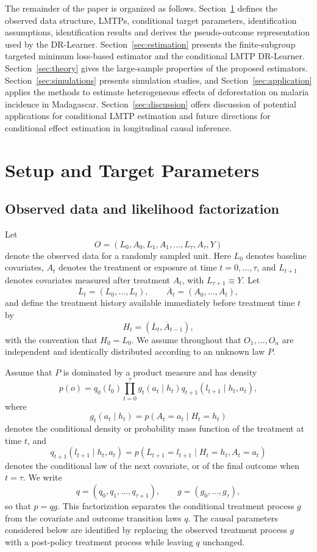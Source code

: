 \documentclass[11pt]{article}
\begin{document}
The remainder of the paper is organized as follows. Section~\ref{sec:setup}
defines the observed data structure, LMTPs, conditional target parameters,
identification assumptions, identification results and derives the
pseudo-outcome representation used by the DR-Learner.
Section~\ref{sec:estimation} presents the finite-subgroup targeted minimum
loss-based estimator and the conditional LMTP DR-Learner.
Section~\ref{sec:theory} gives the large-sample properties of the proposed
estimators. Section~\ref{sec:simulations} presents simulation studies, and
Section~\ref{sec:application} applies the methods to estimate heterogeneous
effects of deforestation on malaria incidence in Madagascar.
Section~\ref{sec:discussion} offers discussion of potential applications for
conditional LMTP estimation and future directions for conditional effect
estimation in longitudinal causal inference.

\section{Setup and Target Parameters}
\label{sec:setup}
\subsection{Observed data and likelihood factorization}
\label{subsec:observed-data}

Let
\[
  O = (L_0, A_0, L_1, A_1, \ldots, L_\tau, A_\tau, Y)
\]
denote the observed data for a randomly sampled unit. Here \(L_0\) denotes
baseline covariates, \(A_t\) denotes the treatment or exposure at time
\(t=0,\ldots,\tau\), and \(L_{t+1}\) denotes covariates measured after treatment
\(A_t\), with \(L_{\tau+1} \equiv Y\). Let
\[
  \overline L_t = (L_0,\ldots,L_t),
  \qquad
  \overline A_t = (A_0,\ldots,A_t),
\]
and define the treatment history available immediately before treatment time
\(t\) by
\[
  H_t = (\overline L_t,\overline A_{t-1}),
\]
with the convention that \(H_0=L_0\). We assume throughout that
\(O_1,\ldots,O_n\) are independent and identically distributed according to an
unknown law \(P\).

Assume that \(P\) is dominated by a product measure and has density
\[
  p(o)
  =
  q_0(l_0)
  \prod_{t=0}^{\tau}
  g_t(a_t \mid h_t)
  q_{t+1}(l_{t+1} \mid h_t,a_t),
\]
where
\[
  g_t(a_t\mid h_t)
  =
  p(A_t=a_t\mid H_t=h_t)
\]
denotes the conditional density or probability mass function of the treatment at
time \(t\), and
\[
  q_{t+1}(l_{t+1}\mid h_t,a_t)
  =
  p(L_{t+1}=l_{t+1}\mid H_t=h_t,A_t=a_t)
\]
denotes the conditional law of the next covariate, or of the final outcome when
\(t=\tau\). We write
\[
  q = (q_0,q_1,\ldots,q_{\tau+1}),
  \qquad
  g = (g_0,\ldots,g_\tau),
\]
so that \(p=qg\). This factorization separates the conditional treatment process
\(g\) from the covariate and outcome transition laws \(q\). The causal parameters
considered below are identified by replacing the observed treatment process
\(g\) with a post-policy treatment process while leaving \(q\) unchanged.
\end{document}
